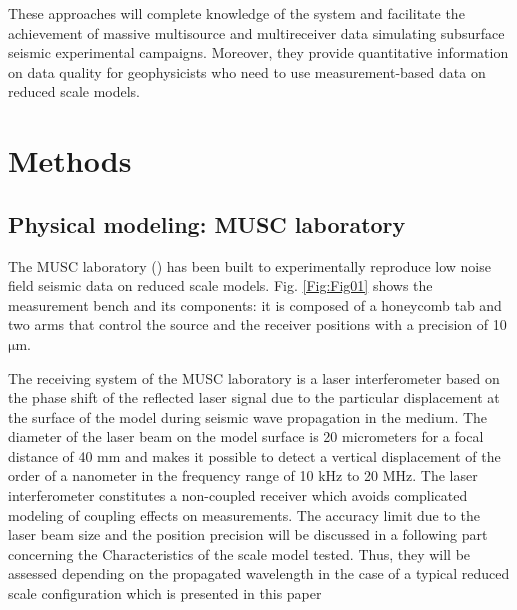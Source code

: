 \documentclass[extra,mreferee]{gji}
\begin{document}

These approaches will complete knowledge of the system and facilitate the achievement of massive multisource and multireceiver data simulating subsurface seismic experimental campaigns. Moreover, they provide quantitative information on data quality for geophysicists who need to use measurement-based data on reduced scale models. 

\section{Methods}

 


\subsection{Physical modeling: MUSC laboratory}

The MUSC laboratory (\cite{Bretaudeau_SSA_2008b,bretaudeau2011ssm,bretaudeau2013fwi}) has been built to experimentally reproduce low noise field seismic data on reduced scale models. Fig. \ref{Fig:Fig01} shows the measurement bench and its components: it is composed of a honeycomb tab and two arms that control the source and the receiver positions with a precision of 10 $\mathrm{\mu m}$.

The receiving system of the MUSC laboratory is a laser interferometer based on the phase shift of the reflected laser signal due to the particular displacement at the surface of the model during seismic wave propagation in the medium. The diameter of the laser beam on the model surface is 20 micrometers for a focal distance of 40 mm and makes it possible to detect a vertical displacement of the order of a nanometer in the frequency range of 10 kHz to 20 MHz. The laser interferometer constitutes a non-coupled receiver which avoids complicated modeling of coupling effects on measurements.{\color{magenta} The accuracy limit due to the laser beam size and the position precision will be discussed in a following part concerning the Characteristics of the scale model tested. Thus, they will be assessed depending on the propagated wavelength in the case of a typical reduced scale configuration which is presented in this paper }
\end{document}
